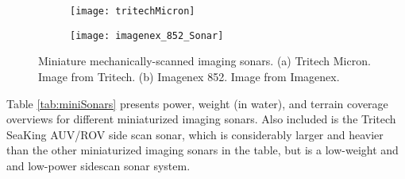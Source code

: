 \begin{figure}[!h]
	\centering
	\begin{subfigure}[b]{0.23\textwidth}
                \texttt{[image: tritechMicron]}
                \caption{}
  	\end{subfigure}
  	\hspace{15ex}
  	\centering
	\begin{subfigure}[b]{0.38\textwidth}
                \texttt{[image: imagenex\_852\_Sonar]}
                \caption{}
  	\end{subfigure}
	\caption{Miniature mechanically-scanned imaging sonars.  (a) Tritech Micron. Image from Tritech. (b) Imagenex 852.  Image from Imagenex.}	
	\label{fig:miniImagingSonars}
\end{figure}

Table \ref{tab:miniSonars} presents power, weight (in water), and terrain coverage overviews for different miniaturized imaging sonars.  Also included is the Tritech SeaKing AUV/ROV side scan sonar, which is considerably larger and heavier than the other miniaturized imaging sonars in the table, but is a low-weight and and low-power sidescan sonar system.

